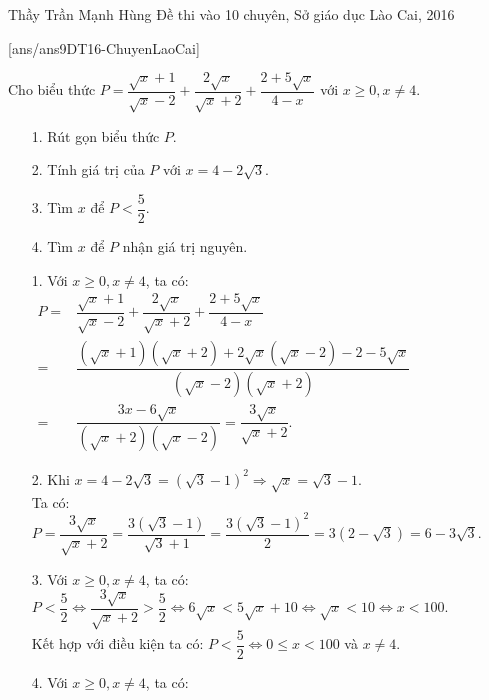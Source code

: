 \begin{name}
{Thầy  Trần Mạnh Hùng}
{Đề thi vào 10 chuyên, Sở giáo dục Lào Cai, 2016}
\end{name}
\setcounter{ex}{0}
[ans/ans9DT16-ChuyenLaoCai]
\begin{ex}%

    Cho biểu thức $P=\dfrac{\sqrt{x}+1}{\sqrt{x}-2}+\dfrac{2\sqrt{x}}{\sqrt{x}+2}+\dfrac{2+5\sqrt{x}}{4-x}$ với $x\ge 0,x\ne 4$.
     \begin{enumerate}
     \item[1.] Rút gọn biểu thức $P$.
     \item[2.] Tính giá trị của $P$ với $x=4-2\sqrt{3}$.
     \item[3.] Tìm $x$ để $P<\dfrac{5}{2}$.
     \item[4.] Tìm $x$ để $P$ nhận giá trị nguyên.
     \end{enumerate}
\loigiai
    {
    \begin{enumerate}
        \item[1.] Với $x\ge 0,x\ne 4$, ta có:\\
        $
        \begin{aligned}
        P=&\dfrac{\sqrt{x}+1}{\sqrt{x}-2}+\dfrac{2\sqrt{x}}{\sqrt{x}+2}+\dfrac{2+5\sqrt{x}}{4-x}\\
        =&\dfrac{\left(\sqrt{x}+1\right)\left(\sqrt{x}+2\right)+2\sqrt{x}\left(\sqrt{x}-2\right)-2-5\sqrt{x}}{\left(\sqrt{x}-2\right)\left(\sqrt{x}+2\right)}\\
        =&\dfrac{3x-6\sqrt{x}}{\left(\sqrt{x}+2\right)\left(\sqrt{x}-2\right)}=\dfrac{3\sqrt{x}}{\sqrt{x}+2}.        
        \end{aligned}
        $
        \item[2.] Khi $x=4-2\sqrt{3}=\left(\sqrt{3}-1\right)^2\Rightarrow \sqrt{x}=\sqrt{3}-1$.\\
        Ta có: $P=\dfrac{3\sqrt{x}}{\sqrt{x}+2}=\dfrac{3\left(\sqrt{3}-1\right)}{\sqrt{3}+1}=\dfrac{3\left(\sqrt{3}-1\right)^2}{2}=3\left(2-\sqrt{3}\right)=6-3\sqrt{3}$.
        \item[3.] Với $x\ge 0,x\ne 4$, ta có:\\
       $ P<\dfrac{5}{2}\Leftrightarrow \dfrac{3\sqrt{x}}{\sqrt{x}+2}>\dfrac{5}{2}
        \Leftrightarrow 6\sqrt{x}<5\sqrt{x}+10\Leftrightarrow \sqrt{x}<10\Leftrightarrow x<100$.\\
        Kết hợp với điều kiện ta có: $P<\dfrac{5}{2}\Leftrightarrow 0\le x<100$ và $x\ne 4$.
        \item[4.] Với $x\ge 0,x\ne 4$, ta có:

\end{enumerate}}
\end{ex}
